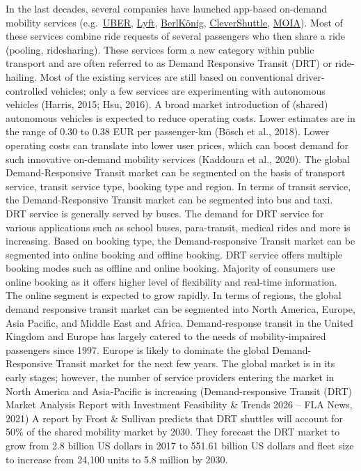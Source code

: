 \documentclass[
]{book}
\begin{document}
In the last decades, several companies have launched app-based on-demand mobility services (e.g.~\href{https://www.uber.com/at/en/}{UBER}, \href{https://www.lyft.com/}{Lyft}, \href{https://www.berlkoenig.de/}{BerlKönig}, \href{https://www.clevershuttle.de/en}{CleverShuttle}, \href{https://www.moia.io/en}{MOIA}). Most of these services combine ride requests of several passengers who then share a ride (pooling, ridesharing). These services form a new category within public transport and are often referred to as Demand Responsive Transit (DRT) or ride-hailing. Most of the existing services are still based on conventional driver-controlled vehicles; only a few services are experimenting with autonomous vehicles (Harris, 2015; Hsu, 2016). A broad market introduction of (shared) autonomous vehicles is expected to reduce operating costs. Lower estimates are in the range of 0.30 to 0.38 EUR per passenger-km (Bösch et al., 2018). Lower operating costs can translate into lower user prices, which can boost demand for such innovative on-demand mobility services (Kaddoura et al., 2020).
The global Demand-Responsive Transit market can be segmented on the basis of transport service, transit service type, booking type and region. In terms of transit service, the Demand-Responsive Transit market can be segmented into bus and taxi. DRT service is generally served by buses. The demand for DRT service for various applications such as school buses, para-transit, medical rides and more is increasing.
Based on booking type, the Demand-responsive Transit market can be segmented into online booking and offline booking. DRT service offers multiple booking modes such as offline and online booking. Majority of consumers use online booking as it offers higher level of flexibility and real-time information. The online segment is expected to grow rapidly.
In terms of regions, the global demand responsive transit market can be segmented into North America, Europe, Asia Pacific, and Middle East and Africa. Demand-response transit in the United Kingdom and Europe has largely catered to the needs of mobility-impaired passengers since 1997. Europe is likely to dominate the global Demand-Responsive Transit market for the next few years.
The global market is in its early stages; however, the number of service providers entering the market in North America and Asia-Pacific is increasing (Demand-responsive Transit (DRT) Market Analysis Report with Investment Feasibility \& Trends 2026 -- FLA News, 2021)
A report by Frost \& Sullivan predicts that DRT shuttles will account for 50\% of the shared mobility market by 2030. They forecast the DRT market to grow from 2.8 billion US dollars in 2017 to 551.61 billion US dollars and fleet size to increase from 24,100 units to 5.8 million by 2030.
\end{document}
